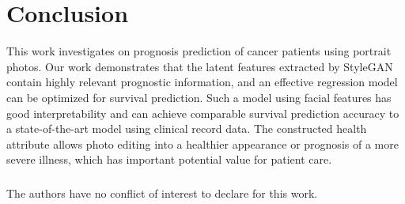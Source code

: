 \documentclass[runningheads]{llncs}
\begin{document}
\section{Conclusion}
This work investigates on prognosis prediction of cancer patients using portrait photos. Our work demonstrates that the latent features extracted by StyleGAN contain highly relevant prognostic information, and an effective regression model can be optimized for survival prediction. Such a model using facial features has good interpretability and can achieve comparable survival prediction accuracy to a state-of-the-art model using clinical record data. The constructed health attribute allows photo editing into a healthier appearance or prognosis of a more severe illness, which has important potential value for patient care. 

\subsubsection{\discintname}
The authors have no conflict of interest to declare for this work.


\end{document}
